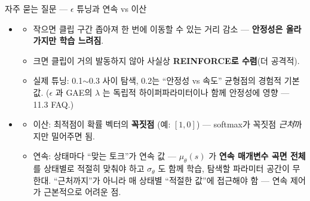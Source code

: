 \begin{frame}{자주 묻는 질문 — $\epsilon$ 튜닝과 연속 vs 이산}
  \small
  \begin{itemize}
    \item {}
      \begin{itemize}
        \item 작으면 클립 구간 좁아져 한 번에 이동할 수 있는
          거리 감소 — \textbf{안정성은 올라가지만 학습 느려짐}.
        \item 크면 클립이 거의 발동하지 않아 사실상
          \textbf{REINFORCE로 수렴}(더 공격적).
        \item 실제 튜닝: 0.1$\sim$0.3 사이 탐색, 0.2는
          ``안정성 vs 속도'' 균형점의 경험적 기본값.
          ($\epsilon$ 과 GAE의 $\lambda$ 는 독립적
          하이퍼파라미터이나 함께 안정성에 영향 — 11.3 FAQ.)
      \end{itemize}
    \item {}
      \begin{itemize}
        \item 이산: 최적점이 확률 벡터의 \textbf{꼭짓점}
          (예: $[1,0]$) — softmax가 꼭짓점 \textit{근처}까지만
          밀어주면 됨.
        \item 연속: 상태마다 ``맞는 토크''가 연속 값 —
          $\mu_\theta(s)$ 가 \textbf{연속 매개변수 곡면 전체}를
          상태별로 적절히 맞춰야 하고 $\sigma_\theta$ 도 함께
          학습, 탐색할 파라미터 공간이 무한대. ``근처까지''가
          아니라 매 상태별 ``적절한 값''에 접근해야 함 —
          연속 제어가 근본적으로 어려운 점.
      \end{itemize}
  \end{itemize}
\end{frame}
